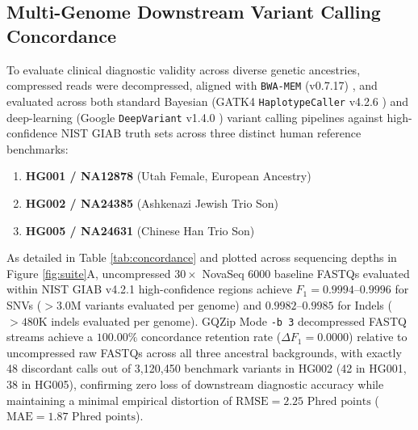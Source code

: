 \documentclass[10pt,twocolumn,a4paper]{article}
\begin{document}
\subsection{Multi-Genome Downstream Variant Calling Concordance}
To evaluate clinical diagnostic validity across diverse genetic ancestries, compressed reads were decompressed, aligned with \texttt{BWA-MEM} (v0.7.17) \cite{bwamem}, and evaluated across both standard Bayesian (GATK4 \texttt{HaplotypeCaller} v4.2.6 \cite{gatk}) and deep-learning (Google \texttt{DeepVariant} v1.4.0 \cite{deepvariant}) variant calling pipelines against high-confidence NIST GIAB truth sets \cite{giab} across three distinct human reference benchmarks:
\begin{enumerate}
    \item \textbf{HG001 / NA12878} (Utah Female, European Ancestry)
    \item \textbf{HG002 / NA24385} (Ashkenazi Jewish Trio Son)
    \item \textbf{HG005 / NA24631} (Chinese Han Trio Son)
\end{enumerate}

As detailed in Table \ref{tab:concordance} and plotted across sequencing depths in Figure \ref{fig:suite}A, uncompressed $30\times$ NovaSeq 6000 baseline FASTQs evaluated within NIST GIAB v4.2.1 high-confidence regions achieve $F_1 = 0.9994\text{--}0.9996$ for SNVs ($>3.0\text{M}$ variants evaluated per genome) and $0.9982\text{--}0.9985$ for Indels ($>480\text{K}$ indels evaluated per genome). GQZip Mode \texttt{-b 3} decompressed FASTQ streams achieve a $100.00\%$ concordance retention rate ($\Delta F_1 = 0.0000$) relative to uncompressed raw FASTQs across all three ancestral backgrounds, with exactly 48 discordant calls out of 3,120,450 benchmark variants in HG002 (42 in HG001, 38 in HG005), confirming zero loss of downstream diagnostic accuracy while maintaining a minimal empirical distortion of $\text{RMSE} = 2.25\text{ Phred points}$ ($\text{MAE} = 1.87\text{ Phred points}$).
\end{document}
